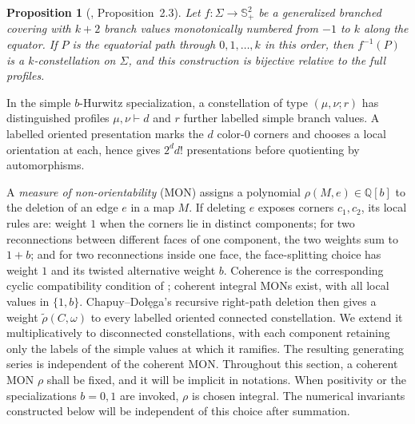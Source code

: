 \documentclass[11pt,a4paper,reqno]{article}
\newtheorem{proposition}[theorem]{Proposition}
\theoremstyle{definition}
\theoremstyle{remark}
\newcommand\Q{{\mathbb Q}}
\begin{document}
\begin{proposition}[\cite{ChapuyDolega22}, Proposition~2.3]\label{prop:covering-constellation-correspondence}
Let $f:\Sigma\to\mathbb S_+^2$ be a generalized branched covering with $k+2$ branch values monotonically numbered from $-1$ to $k$ along the equator.  If $P$ is the equatorial path through $0,1,\ldots,k$ in this order, then $f^{-1}(P)$ is a $k$-constellation on $\Sigma$, and this construction is bijective relative to the full profiles.
\end{proposition}

In the simple $b$-Hurwitz specialization, a constellation of type $(\mu,\nu;r)$ has distinguished profiles $\mu,\nu\vdash d$ and $r$ further labelled simple branch values.  A labelled oriented presentation marks the $d$ color-$0$ corners and chooses a local orientation at each, hence gives $2^d d!$ presentations before quotienting by automorphisms.

A \emph{measure of non-orientability} (MON) assigns a polynomial $\rho(M,e)\in\Q[b]$ to the deletion of an edge $e$ in a map $M$.  If deleting $e$ exposes corners $c_1,c_2$, its local rules are: weight $1$ when the corners lie in distinct components; for two reconnections between different faces of one component, the two weights sum to $1+b$; and for two reconnections inside one face, the face-splitting choice has weight $1$ and its twisted alternative weight $b$.  Coherence is the corresponding cyclic compatibility condition of \cite[Definition~3.2]{ChapuyDolega22}; coherent integral MONs exist, with all local values in $\{1,b\}$.  Chapuy--Do\l\k{e}ga's recursive right-path deletion then gives a weight $\widetilde\rho(C,\omega)$ to every labelled oriented connected constellation.  We extend it multiplicatively to disconnected constellations, with each component retaining only the labels of the simple values at which it ramifies.  The resulting generating series is independent of the coherent MON. Throughout this section, a coherent MON $\rho$ shall be fixed, and it will be implicit in notations. When positivity or the specializations $b=0,1$ are invoked, $\rho$ is chosen integral.  The numerical invariants constructed below will be independent of this choice after summation.
\end{document}
